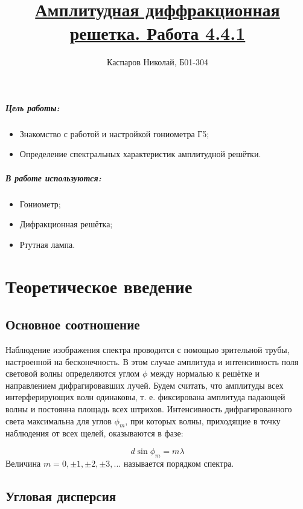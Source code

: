 \documentclass[a4paper]{article}
\title{\underline{Амплитудная диффракционная решетка. Работа 4.4.1}}
\author{Каспаров Николай, Б01-304}
\begin{document}
\maketitle
\begin{center}
\Large{\textbf{ }}
\end{center}

\subparagraph{Цель работы:}

\begin{itemize}
    \item Знакомство с работой и настройкой гониометра Г5;
    \item Определение спектральных характеристик амплитудной решётки.
\end{itemize}

\subparagraph{В работе используются:}

\begin{itemize}
    \item Гониометр;
    \item Дифракционная решётка;
    \item Ртутная лампа.
\end{itemize}

\section{Теоретическое введение}

    \subsection{Основное соотношение}

    Наблюдение изображения спектра проводится с помощью зрительной трубы,
    настроенной на бесконечность.
    В этом случае амплитуда и интенсивность поля световой волны определяются углом $\phi$ между нормалью к решётке и направлением дифрагировавших лучей.
    Будем считать, что амплитуды всех интерферирующих волн одинаковы,
    т. е. фиксирована амплитуда падающей волны и постоянна площадь всех штрихов.
    Интенсивность дифрагированного света максимальна для углов $\phi_m$,
    при которых волны, приходящие в точку наблюдения от всех щелей, оказываются в фазе:

    \begin{equation}
        d \sin{\phi_m} = m \lambda
        \label{main_eq}
    \end{equation}
    Величина $m = 0, \pm 1, \pm 2, \pm 3, ...$ называется порядком спектра.

    \subsection{Угловая дисперсия}
\end{document}
